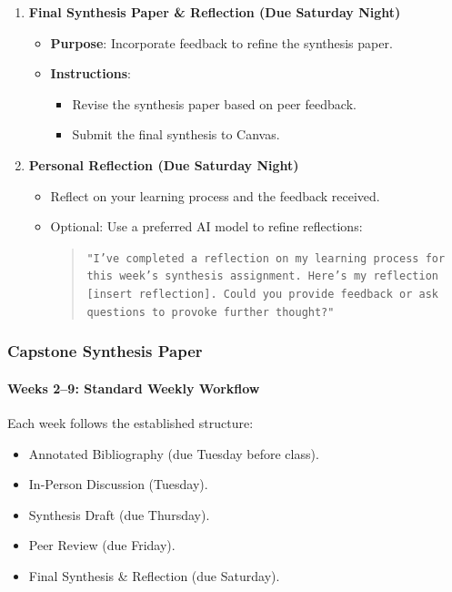 \documentclass[12pt, letterpaper]{article}
\begin{document}
\begin{enumerate}
    \item \textbf{Final Synthesis Paper \& Reflection (Due Saturday Night)}
    \begin{itemize}
        \item \textbf{Purpose}: Incorporate feedback to refine the synthesis paper.
        \item \textbf{Instructions}:
        \begin{itemize}
            \item Revise the synthesis paper based on peer feedback.
            \item Submit the final synthesis to Canvas.
        \end{itemize}
    \end{itemize}

    \item \textbf{Personal Reflection (Due Saturday Night)}
            \begin{itemize}
                \item Reflect on your learning process and the feedback received.
                \item Optional: Use a preferred AI model to refine reflections:
                \begin{quote}
                    \texttt{"I've completed a reflection on my learning process for this week's synthesis assignment. Here's my reflection [insert reflection]. Could you provide feedback or ask questions to provoke further thought?"}
                \end{quote}
            \end{itemize}
\end{enumerate}

\subsubsection*{Capstone Synthesis Paper}

\paragraph{Weeks 2--9: Standard Weekly Workflow}
Each week follows the established structure:
\begin{itemize}
    \item Annotated Bibliography (due Tuesday before class).
    \item In-Person Discussion (Tuesday).
    \item Synthesis Draft (due Thursday).
    \item Peer Review (due Friday).
    \item Final Synthesis \& Reflection (due Saturday).
\end{itemize}
\end{document}
